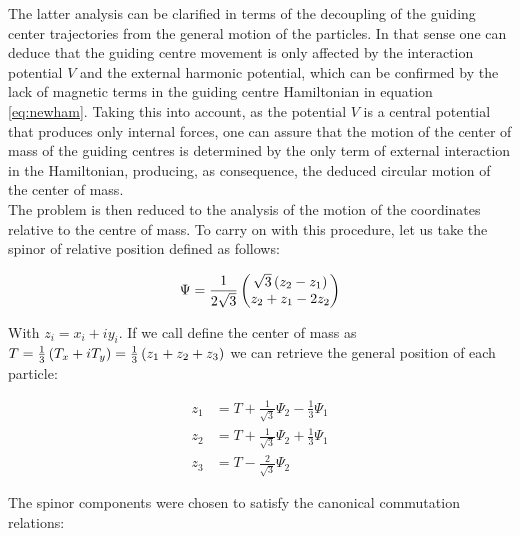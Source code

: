 The latter analysis can be clarified in terms of the decoupling of the guiding center trajectories from the general motion of the particles. In that sense one can deduce that the guiding centre movement is only affected by the interaction potential $V$ and the external harmonic potential, which can be confirmed by the lack of magnetic terms in the guiding centre Hamiltonian in equation \eqref{eq:newham}. Taking this into account, as the potential $V$ is a central potential that produces only internal forces, one can assure that the motion of the center of mass of the guiding centres is determined by the only term of external interaction in the Hamiltonian, producing, as consequence, the deduced circular motion of the center of mass.\\

The problem is then reduced to the analysis of the motion of the coordinates relative to the centre of mass. To carry on with this procedure, let us take the spinor of relative position defined as follows:

\begin{align}
\Psi = \frac{1}{2\sqrt{3}}\begin{pmatrix}\sqrt{3}\left( z_{2}-z_{1} \right)\\
z_{2}+z_{1}-2z_{2}\end{pmatrix}
\end{align}

With $z_{i} = x_i + iy_i$. If we call define the center of mass as $T = \frac{1}{3}\left( T_x + iT_y \right) = \frac{1}{3}\left( z_1 +z_2+z_3 \right)$ we can retrieve the general position of each particle:

\small
\begin{equation}
\begin{aligned}
z_1 &= T+\frac{1}{\sqrt{3}}\Psi_2 - \frac{1}{3}\Psi_1 \\
z_2 &= T+\frac{1}{\sqrt{3}}\Psi_2 + \frac{1}{3}\Psi_1 \\
z_3 &= T-\frac{2}{\sqrt{3}}\Psi_2
\end{aligned}
\label{eq:singlevecs}
\end{equation}
\normalsize

The spinor components were chosen to satisfy the canonical commutation relations:


